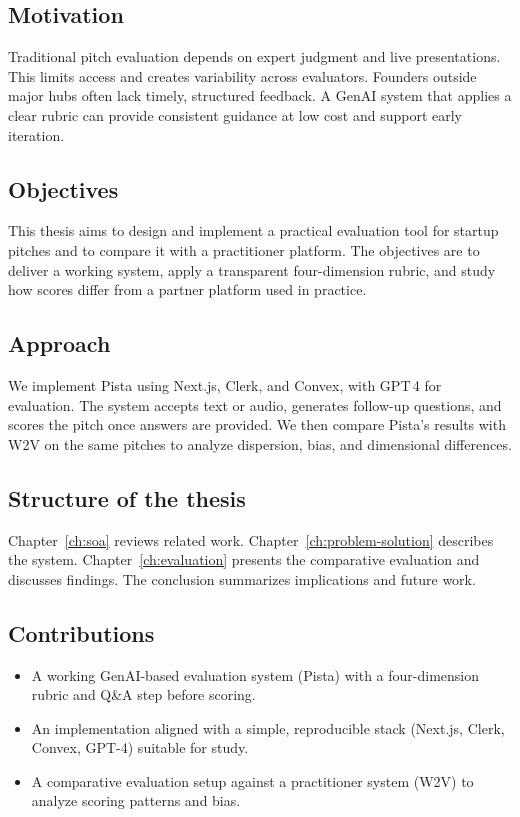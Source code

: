 \subsection{Motivation}
Traditional pitch evaluation depends on expert judgment and live presentations. This limits access and creates variability across evaluators. Founders outside major hubs often lack timely, structured feedback. A GenAI system that applies a clear rubric can provide consistent guidance at low cost and support early iteration.

\subsection{Objectives}
This thesis aims to design and implement a practical evaluation tool for startup pitches and to compare it with a practitioner platform. The objectives are to deliver a working system, apply a transparent four-dimension rubric, and study how scores differ from a partner platform used in practice.

\subsection{Approach}
We implement Pista using Next.js, Clerk, and Convex, with GPT\,4 for evaluation. The system accepts text or audio, generates follow-up questions, and scores the pitch once answers are provided. We then compare Pista’s results with W2V on the same pitches to analyze dispersion, bias, and dimensional differences.

\subsection{Structure of the thesis}
Chapter~\ref{ch:soa} reviews related work. Chapter~\ref{ch:problem-solution} describes the system. Chapter~\ref{ch:evaluation} presents the comparative evaluation and discusses findings. The conclusion summarizes implications and future work.

\subsection{Contributions}
\begin{itemize}
  \item A working GenAI-based evaluation system (Pista) with a four-dimension rubric and Q\&A step before scoring.
  \item An implementation aligned with a simple, reproducible stack (Next.js, Clerk, Convex, GPT-4) suitable for study.
  \item A comparative evaluation setup against a practitioner system (W2V) to analyze scoring patterns and bias.
\end{itemize}

